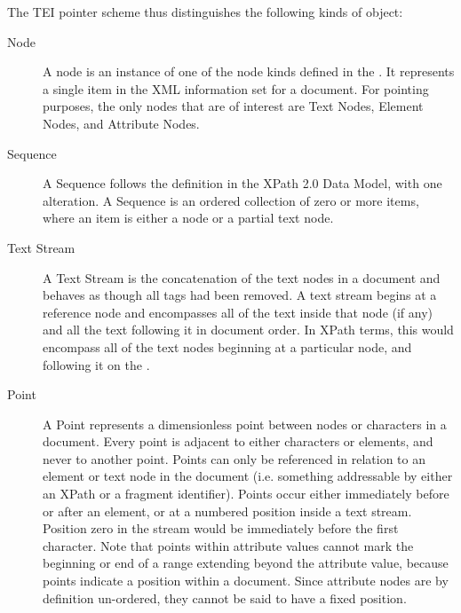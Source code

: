 The TEI pointer scheme thus distinguishes the following kinds of object: \begin{description}

\item[{Node}]A node is an instance of one of the node kinds defined in the . It represents a single item in the XML information set for a document. For pointing purposes, the only nodes that are of interest are Text Nodes, Element Nodes, and Attribute Nodes.
\item[{Sequence}]A Sequence follows the definition in the XPath 2.0 Data Model, with one alteration. A Sequence is an ordered collection of zero or more items, where an item is either a node or a partial text node. 
\item[{Text Stream}]A Text Stream is the concatenation of the text nodes in a document and behaves as though all tags had been removed. A text stream begins at a reference node and encompasses all of the text inside that node (if any) and all the text following it in document order. In XPath terms, this would encompass all of the text nodes beginning at a particular node, and following it on the .
\item[{Point}]A Point represents a dimensionless point between nodes or characters in a document. Every point is adjacent to either characters or elements, and never to another point. Points can only be referenced in relation to an element or text node in the document (i.e. something addressable by either an XPath or a fragment identifier). Points occur either immediately before or after an element, or at a numbered position inside a text stream. Position zero in the stream would be immediately before the first character. Note that points within attribute values cannot mark the beginning or end of a range extending beyond the attribute value, because points indicate a position within a document. Since attribute nodes are by definition un-ordered, they cannot be said to have a fixed position. 
\end{description} \par

